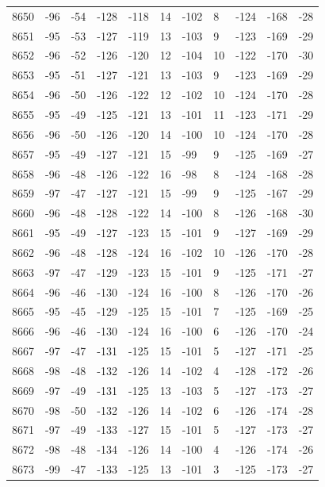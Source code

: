 \begin{table}[H]
\begin{tabular}{lllllllllll}
8650 & -96 & -54 & -128 & -118 & 14 & -102 & 8 & -124 & -168 & -28 \\
8651 & -95 & -53 & -127 & -119 & 13 & -103 & 9 & -123 & -169 & -29 \\
8652 & -96 & -52 & -126 & -120 & 12 & -104 & 10 & -122 & -170 & -30 \\
8653 & -95 & -51 & -127 & -121 & 13 & -103 & 9 & -123 & -169 & -29 \\
8654 & -96 & -50 & -126 & -122 & 12 & -102 & 10 & -124 & -170 & -28 \\
8655 & -95 & -49 & -125 & -121 & 13 & -101 & 11 & -123 & -171 & -29 \\
8656 & -96 & -50 & -126 & -120 & 14 & -100 & 10 & -124 & -170 & -28 \\
8657 & -95 & -49 & -127 & -121 & 15 & -99 & 9 & -125 & -169 & -27 \\
8658 & -96 & -48 & -126 & -122 & 16 & -98 & 8 & -124 & -168 & -28 \\
8659 & -97 & -47 & -127 & -121 & 15 & -99 & 9 & -125 & -167 & -29 \\
8660 & -96 & -48 & -128 & -122 & 14 & -100 & 8 & -126 & -168 & -30 \\
8661 & -95 & -49 & -127 & -123 & 15 & -101 & 9 & -127 & -169 & -29 \\
8662 & -96 & -48 & -128 & -124 & 16 & -102 & 10 & -126 & -170 & -28 \\
8663 & -97 & -47 & -129 & -123 & 15 & -101 & 9 & -125 & -171 & -27 \\
8664 & -96 & -46 & -130 & -124 & 16 & -100 & 8 & -126 & -170 & -26 \\
8665 & -95 & -45 & -129 & -125 & 15 & -101 & 7 & -125 & -169 & -25 \\
8666 & -96 & -46 & -130 & -124 & 16 & -100 & 6 & -126 & -170 & -24 \\
8667 & -97 & -47 & -131 & -125 & 15 & -101 & 5 & -127 & -171 & -25 \\
8668 & -98 & -48 & -132 & -126 & 14 & -102 & 4 & -128 & -172 & -26 \\
8669 & -97 & -49 & -131 & -125 & 13 & -103 & 5 & -127 & -173 & -27 \\
8670 & -98 & -50 & -132 & -126 & 14 & -102 & 6 & -126 & -174 & -28 \\
8671 & -97 & -49 & -133 & -127 & 15 & -101 & 5 & -127 & -173 & -27 \\
8672 & -98 & -48 & -134 & -126 & 14 & -100 & 4 & -126 & -174 & -26 \\
8673 & -99 & -47 & -133 & -125 & 13 & -101 & 3 & -125 & -173 & -27 \\

\end{tabular}
\end{table}
